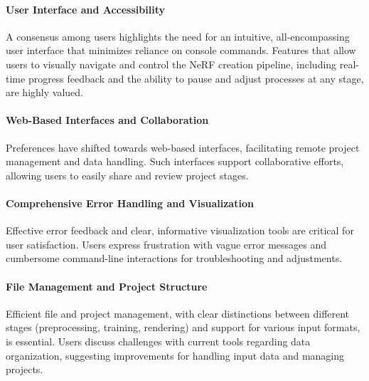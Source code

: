 \paragraph{User Interface and Accessibility}

A consensus among users highlights the need for an intuitive, all-encompassing user interface that minimizes reliance on console commands. 
Features that allow users to visually navigate and control the NeRF creation pipeline, including real-time progress feedback and the ability to pause and adjust processes at any stage, are highly valued.

\paragraph{Web-Based Interfaces and Collaboration}

Preferences have shifted towards web-based interfaces, facilitating remote project management and data handling. 
Such interfaces support collaborative efforts, allowing users to easily share and review project stages.

\paragraph{Comprehensive Error Handling and Visualization}

Effective error feedback and clear, informative visualization tools are critical for user satisfaction. 
Users express frustration with vague error messages and cumbersome command-line interactions for troubleshooting and adjustments.

\paragraph{File Management and Project Structure}

Efficient file and project management, with clear distinctions between different stages (preprocessing, training, rendering) and support for various input formats, is essential. 
Users discuss challenges with current tools regarding data organization, suggesting improvements for handling input data and managing projects​​.



